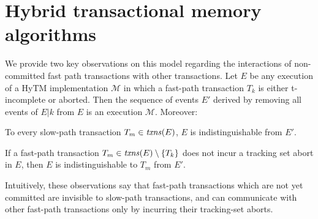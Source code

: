 \section{Hybrid transactional memory algorithms}
%
We provide two key observations on this model regarding the interactions of non-committed fast path transactions 
with other transactions. 
Let $E$ be any execution of a HyTM implementation $\mathcal{M}$ in
which a fast-path transaction $T_k$ is either
t-incomplete or aborted. 
Then the sequence of events $E'$ derived by removing all events of $E|k$
from $E$ is an execution  $\mathcal{M}$. Moreover: 
\begin{observation} 
\label{ob:one}
To every slow-path transaction $T_m \in \ms{txns}(E)$, $E$ is indistinguishable 
from $E'$. 
\end{observation}
%
% 	 
%
\begin{observation} 
\label{ob:two}
If a fast-path transaction $T_m\in \ms{txns}(E) \setminus \{T_k\}$ does not incur a tracking set abort in $E$, 
then $E$ is indistinguishable to $T_m$ from $E'$.
\end{observation}
%
Intuitively, these observations say that fast-path transactions which are not yet committed are 
invisible to slow-path transactions, and can communicate with other
fast-path transactions only by incurring their tracking-set aborts.
%

%
